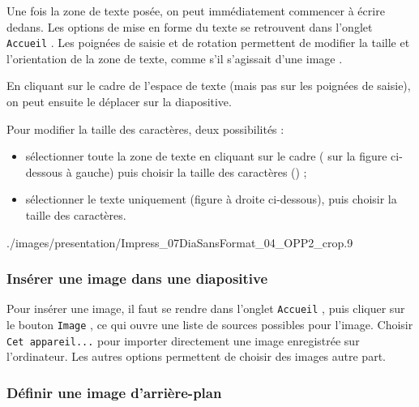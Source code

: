 Une fois la zone de texte posée, on peut immédiatement commencer à écrire dedans. Les options de mise en forme du texte se retrouvent dans l'onglet \texttt{Accueil} . Les poignées de saisie et de rotation permettent de modifier la taille et l'orientation de la zone de texte, comme s'il s'agissait d'une image .


\vspace{1em}

En cliquant sur le cadre de l'espace de texte (mais pas sur les poignées de saisie), on peut ensuite le déplacer sur la diapositive. 

\vspace{1em}

Pour modifier la taille des caractères, deux possibilités :
\begin{itemize}
\item sélectionner toute la zone de texte en cliquant sur le cadre ( sur la figure ci-dessous à gauche) puis choisir la taille des caractères () ; 
\item sélectionner le texte uniquement (figure à droite ci-dessous), puis choisir la taille des caractères.
\end{itemize}

	      {./images/presentation/Impress_07DiaSansFormat_04_OPP2_crop}{.9\textwidth}


\subsubsection{Insérer une image dans une diapositive}\label{Presentation1image}

Pour insérer une image, il faut se rendre dans l'onglet \texttt{Accueil} , puis cliquer sur le bouton \texttt{Image} , ce qui ouvre une liste de sources possibles pour l'image. Choisir \texttt{Cet appareil...}  pour importer directement une image enregistrée sur l'ordinateur. Les autres options permettent de choisir des images autre part.




\subsubsection{Définir une image d'arrière-plan}\label{Presentation1imageFond}

